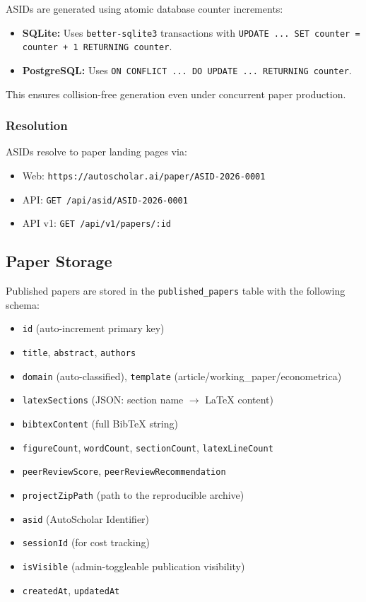 ASIDs are generated using atomic database counter increments:

\begin{itemize}
  \item \textbf{SQLite:} Uses \texttt{better-sqlite3} transactions with \texttt{UPDATE ... SET counter = counter + 1 RETURNING counter}.
  \item \textbf{PostgreSQL:} Uses \texttt{ON CONFLICT ... DO UPDATE ... RETURNING counter}.
\end{itemize}

This ensures collision-free generation even under concurrent paper production.

\subsubsection{Resolution}

ASIDs resolve to paper landing pages via:
\begin{itemize}
  \item Web: \texttt{https://autoscholar.ai/paper/ASID-2026-0001}
  \item API: \texttt{GET /api/asid/ASID-2026-0001}
  \item API v1: \texttt{GET /api/v1/papers/:id}
\end{itemize}

\subsection{Paper Storage}

Published papers are stored in the \texttt{published\_papers} table with the following schema:

\begin{itemize}
  \item \texttt{id} (auto-increment primary key)
  \item \texttt{title}, \texttt{abstract}, \texttt{authors}
  \item \texttt{domain} (auto-classified), \texttt{template} (article/working\_paper/econometrica)
  \item \texttt{latexSections} (JSON: section name $\to$ \LaTeX{} content)
  \item \texttt{bibtexContent} (full BibTeX string)
  \item \texttt{figureCount}, \texttt{wordCount}, \texttt{sectionCount}, \texttt{latexLineCount}
  \item \texttt{peerReviewScore}, \texttt{peerReviewRecommendation}
  \item \texttt{projectZipPath} (path to the reproducible archive)
  \item \texttt{asid} (AutoScholar Identifier)
  \item \texttt{sessionId} (for cost tracking)
  \item \texttt{isVisible} (admin-toggleable publication visibility)
  \item \texttt{createdAt}, \texttt{updatedAt}
\end{itemize}

